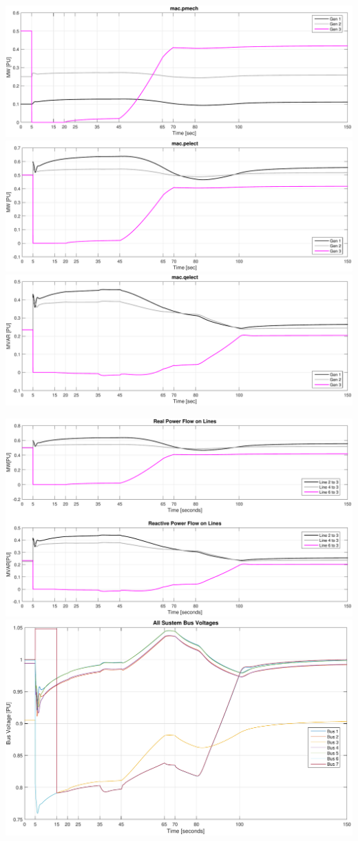 \documentclass[12pt]{article}
\begin{document}
\pagebreak
\includegraphics[width=\linewidth]{distinctPmech}
\includegraphics[width=\linewidth]{distinctPelect}
\includegraphics[width=\linewidth]{distinctQelect}

\pagebreak
\includegraphics[width=\linewidth]{distinctLoadFlow}
\includegraphics[width=\linewidth]{distinctBusV}
\end{document}
